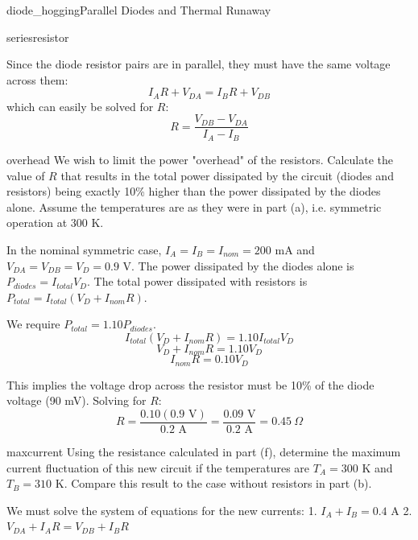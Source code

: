 \begin{mainquestion}{diode_hogging}{Parallel Diodes and Thermal Runaway}
\begin{partquestion}{seriesresistor}
\begin{answer}
        Since the diode resistor pairs are in parallel, they must have the same voltage across them:    \[ I_A R + V_{DA} = I_B R + V_{DB} \]
        which can easily be solved for $R$:
        \[ R = \frac{V_{DB} - V_{DA}}{I_A - I_B} \]
\end{answer}

\end{partquestion}

\begin{partquestion}{overhead}
{We wish to limit the power "overhead" of the resistors. Calculate the value of $R$ that results in the total power dissipated by the circuit (diodes and resistors) being exactly 10\% higher than the power dissipated by the diodes alone. Assume the temperatures are as they were in part (a), i.e. symmetric operation at 300 K.}

\begin{answer}
        In the nominal symmetric case, $I_A = I_B = I_{nom} = 200 \text{ mA}$ and $V_{DA} = V_{DB} = V_D = 0.9 \text{ V}$.
        The power dissipated by the diodes alone is $P_{diodes} = I_{total} V_D$.
        The total power dissipated with resistors is $P_{total} = I_{total} (V_D + I_{nom} R)$.
        
        We require $P_{total} = 1.10 P_{diodes}$.
        \[ I_{total} (V_D + I_{nom} R) = 1.10 I_{total} V_D \]
        \[ V_D + I_{nom} R = 1.10 V_D \]
        \[ I_{nom} R = 0.10 V_D \]
        
        This implies the voltage drop across the resistor must be 10\% of the diode voltage (90 mV). Solving for $R$:
        \[ R = \frac{0.10(0.9 \text{ V})}{0.2 \text{ A}} = \frac{0.09 \text{ V}}{0.2 \text{ A}} = 0.45 \ \Omega \]
\end{answer}

\end{partquestion}

\begin{partquestion}{maxcurrent}
{Using the resistance calculated in part (f), determine the maximum current fluctuation of this new circuit if the temperatures are $T_A = 300 \text{ K}$ and $T_B = 310 \text{ K}$. Compare this result to the case without resistors in part (b).}

\begin{answer}
        We must solve the system of equations for the new currents:
        1. $I_A + I_B = 0.4 \text{ A}$
        2. $V_{DA} + I_A R = V_{DB} + I_B R$
        

\end{answer}
\end{partquestion}
\end{mainquestion}
